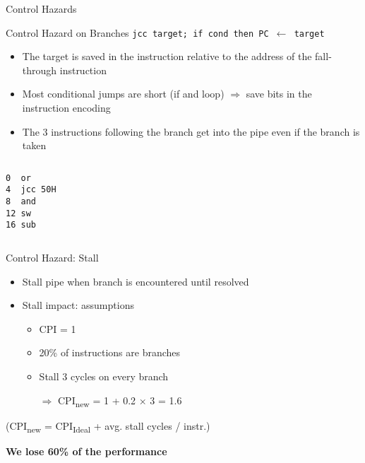 \documentclass[aspectratio=169,12pt]{beamer}
\begin{document}
\begin{frame}
    \begin{center}
        \Huge Control Hazards
    \end{center}
\end{frame}

\begin{frame}[fragile]{Control Hazard on Branches}
    \texttt{jcc target; if cond then PC $\leftarrow$ target}
    
    \begin{itemize}
        \item The target is saved in the instruction relative to the address of the fall-through instruction
        \item Most conditional jumps are short (if and loop) $\Rightarrow$ save bits in the instruction encoding
        \item The 3 instructions following the branch get into the pipe even if the branch is taken
    \end{itemize}
    
    \begin{columns}
        \begin{verbatim}
0  or
4  jcc 50H
8  and
12 sw
16 sub
        \end{verbatim}
        
        \centering
    \end{columns}
\end{frame}

\begin{frame}{Control Hazard: Stall}
    \begin{itemize}
        \item Stall pipe when branch is encountered until resolved
        \item Stall impact: assumptions
        \begin{itemize}
            \item CPI = 1
            \item 20\% of instructions are branches
            \item Stall 3 cycles on every branch
            \item[$\Rightarrow$] CPI\textsubscript{new} = 1 + 0.2 × 3 = 1.6
        \end{itemize}
    \end{itemize}
    
    \vspace{0.5cm}
    \centering
    (CPI\textsubscript{new} = CPI\textsubscript{Ideal} + avg. stall cycles / instr.)
    
    \vspace{0.5cm}
    \textbf{We lose 60\% of the performance}
\end{frame}
\end{document}
